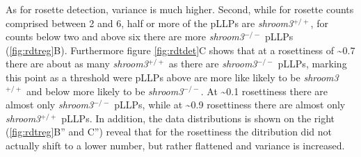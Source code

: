 \documentclass[11pt,singlespacinge,twoside]{reedthesis} %
\theoremstyle{definition}
\theoremstyle{definition}
\theoremstyle{definition}
\theoremstyle{remark}
\begin{document}
As for rosette detection, variance is much higher. Second, while for rosette counts comprised between 2 and 6, half or more of the pLLPs are \emph{shroom3}\(^{+/+}\), for counts below two and above six there are more \emph{shroom3}\(^{-/-}\) pLLPs (\ref{fig:rdtreg}B). Furthermore figure \ref{fig:rdtdet}C shows that at a rosettiness of \textasciitilde0.7 there are about as many \emph{shroom3}\(^{+/+}\) as there are \emph{shroom3}\(^{-/-}\) pLLPs, marking this point as a threshold were pLLPs above are more like likely to be \emph{shroom3}\(^{+/+}\) and below more likely to be \emph{shroom3}\(^{-/-}\). At \textasciitilde0.1 rosettiness there are almost only \emph{shroom3}\(^{-/-}\) pLLPs, while at \textasciitilde0.9 rosettiness there are almost only \emph{shroom3}\(^{+/+}\) pLLPs.
In addition, the data distributions is shown on the right (\ref{fig:rdtreg}B'' and C'') reveal that for the rosettiness the ditribution did not actually shift to a lower number, but rather flattened and variance is increased.
\end{document}
